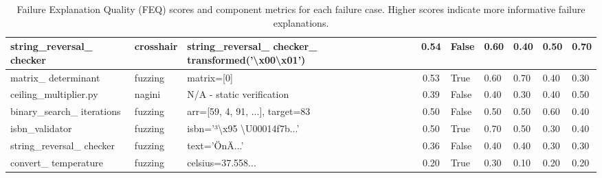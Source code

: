 \documentclass[8pt]{extarticle}
\begin{document}
\begin{table}[H]
\begin{tabular}{|p{2.8cm}|p{1.2cm}|p{2.5cm}|c|p{1.2cm}|p{1.2cm}|p{1.2cm}|p{1.2cm}|p{1.3cm}|}
string\_reversal\_ checker & crosshair & string\_reversal\_ checker\_ transformed('\textbackslash x00\textbackslash x01') & 0.54 & False & 0.60 & 0.40 & 0.50 & 0.70 \\ \hline
matrix\_ determinant & fuzzing & matrix=[0] & 0.53 & True & 0.60 & 0.70 & 0.40 & 0.30 \\ \hline
ceiling\_multiplier.py & nagini & N/A - static verification & 0.39 & False & 0.40 & 0.30 & 0.40 & 0.50 \\ \hline
binary\_search\_ iterations & fuzzing & arr=[59, 4, 91, ...], target=83 & 0.50 & False & 0.50 & 0.50 & 0.60 & 0.40 \\\hline 
isbn\_validator & fuzzing & isbn='³\textbackslash x95 \textbackslash U00014f7b...' & 0.50 & True & 0.70 & 0.50 & 0.30 & 0.40 \\\hline
string\_reversal\_ checker & fuzzing & text='ÖnÄ...' & 0.36 & False & 0.40 & 0.40 & 0.30 & 0.30 \\\hline
convert\_ temperature & fuzzing & celsius=37.558... & 0.20 & True & 0.30 & 0.10 & 0.20 & 0.20 \\
\hline
\end{tabular}
\caption{Failure Explanation Quality (FEQ) scores and component metrics for each failure case. Higher scores indicate more informative failure explanations.}
\label{tab:feq-scores}
\end{table}
\end{document}
